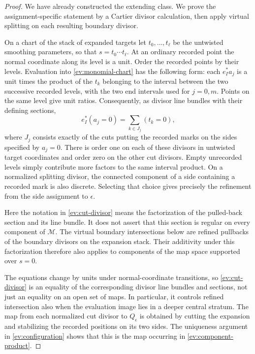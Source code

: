 \begin{proof}
We have already constructed the extending class.  We prove the
assignment-specific statement by a Cartier divisor calculation,
then apply virtual splitting on each resulting boundary divisor.

On a chart of the stack of expanded targets let
$t_0,\ldots,t_\ell$ be the untwisted smoothing parameters, so that
$s=t_0\cdots t_\ell$.  At an ordinary recorded point the normal
coordinate along its level is a unit.  Order the recorded points by
their levels.  Evaluation into \eqref{ev:monomial-chart} has the
following form: each $e_I^*a_j$ is a unit times the product of the
$t_k$ belonging to the interval between the two successive recorded
levels, with the two end intervals used for $j=0,m$.  Points on the
same level give unit ratios.  Consequently, as divisor line bundles
with their defining sections,
\begin{equation}
\label{ev:cut-divisor}
  e_I^*(a_j=0)
  =\sum_{k\in J_j}(t_k=0),
\end{equation}
where $J_j$ consists exactly of the cuts putting the recorded marks
on the sides specified by $a_j=0$.  There is order one on each of
these divisors in untwisted target coordinates and order zero on the
other cut divisors.  Empty unrecorded levels simply contribute more
factors to the same interval product.  On a normalized splitting
divisor, the connected component of a side containing a recorded
mark is also discrete.  Selecting that choice gives precisely the
refinement from the side assignment to $\epsilon$.

Here the notation in \eqref{ev:cut-divisor} means the factorization
of the pulled-back section and its line bundle.  It does not assert
that this section is regular on every component of $\mathcal M$.
The virtual boundary intersections below are refined pullbacks of
the boundary divisors on the expansion stack.  Their additivity
under this factorization therefore also applies to components of
the map space supported over $s=0$.

The equations change by units under normal-coordinate transitions,
so \eqref{ev:cut-divisor} is an equality of the corresponding divisor
line bundles and sections, not just an equality on an open set of
maps.  In particular, it controls refined intersection also when the
evaluation image lies in a deeper central stratum.  The map from
each normalized cut divisor to $Q_\epsilon$ is obtained by cutting
the expansion and stabilizing the recorded positions on its two
sides.  The uniqueness argument in \cref{ev:configuration} shows
that this is the map occurring in
\eqref{ev:component-product}.


\end{proof}
